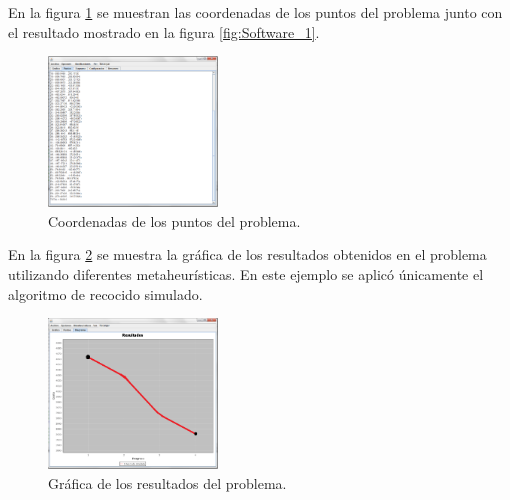 \hspace*{1cm}En la figura \ref {fig:Software_2} se muestran las coordenadas de los puntos del problema junto con el resultado mostrado en la figura \ref {fig:Software_1}.\\
     \begin{figure}[hbtp]
        \centering
            \includegraphics[width=0.4\textwidth]{Software/Imagenes/Software_2.png}
            \caption{Coordenadas de los puntos del problema.}
            \label{fig:Software_2}
    \end{figure}
    
\hspace*{1cm}En la figura \ref {fig:Software_3} se muestra la gráfica de los resultados obtenidos en el problema utilizando diferentes metaheurísticas. En este ejemplo se aplicó únicamente el algoritmo de recocido simulado.\\
     \begin{figure}[hbtp]
        \centering
            \includegraphics[width=0.4\textwidth]{Software/Imagenes/Software_3.png}
            \caption{Gráfica de los resultados del problema.}
            \label{fig:Software_3}
    \end{figure}
  
